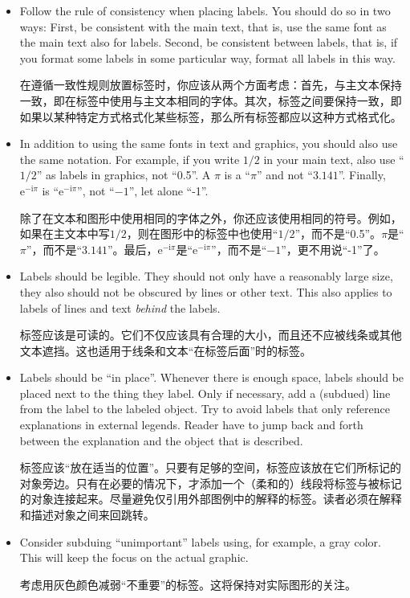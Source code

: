\begin{itemize}
    \item Follow the rule of consistency when placing labels. You should do
        so in two ways: First, be consistent with the main text, that is, use
        the same font as the main text also for labels. Second, be consistent
        between labels, that is, if you format some labels in some particular
        way, format all labels in this way.

        在遵循一致性规则放置标签时，你应该从两个方面考虑：首先，与主文本保持一致，即在标签中使用与主文本相同的字体。其次，标签之间要保持一致，即如果以某种特定方式格式化某些标签，那么所有标签都应以这种方式格式化。


    \item In addition to using the same fonts in text and graphics, you
        should also use the same notation. For example, if you write $1/2$ in
        your main text, also use ``$1/2$'' as labels in graphics, not
        ``0.5''. A $\pi$ is a ``$\pi$'' and not ``$3.141$''. Finally,
        $\mathrm e^{-\mathrm i \pi}$ is ``$\mathrm e^{-\mathrm i \pi}$'', not
        ``$-1$'', let alone ``-1''.

        除了在文本和图形中使用相同的字体之外，你还应该使用相同的符号。例如，如果在主文本中写$1/2$，则在图形中的标签中也使用“$1/2$”，而不是“0.5”。$\pi$是“$\pi$”，而不是“$3.141$”。最后，$\mathrm e^{-\mathrm i \pi}$是“$\mathrm e^{-\mathrm i \pi}$”，而不是“$-1$”，更不用说“-1”了。


    \item Labels should be legible. They should not only have a reasonably
        large size, they also should not be obscured by lines or other text.
        This also applies to labels of lines and text \emph{behind} the
        labels.

        标签应该是可读的。它们不仅应该具有合理的大小，而且还不应被线条或其他文本遮挡。这也适用于线条和文本“在标签后面”时的标签。


    \item Labels should be ``in  place''. Whenever there is enough space,
        labels should be placed next to the thing they label. Only if
        necessary, add a (subdued) line from the label to the labeled object.
        Try to avoid labels that only reference explanations in external
        legends. Reader have to jump back and forth between the explanation and
        the object that is described.

        标签应该“放在适当的位置”。只要有足够的空间，标签应该放在它们所标记的对象旁边。只有在必要的情况下，才添加一个（柔和的）线段将标签与被标记的对象连接起来。尽量避免仅引用外部图例中的解释的标签。读者必须在解释和描述对象之间来回跳转。


    \item Consider subduing ``unimportant'' labels using, for example, a gray
        color. This will keep the focus on the actual graphic.

        考虑用灰色颜色减弱“不重要”的标签。这将保持对实际图形的关注。


\end{itemize}


